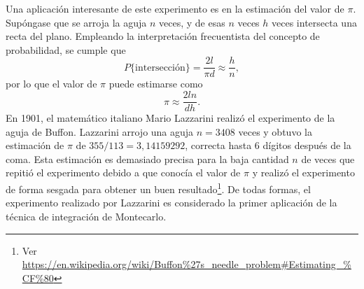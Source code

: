 \documentclass[a4paper]{report}
\begin{document}
Una aplicación interesante de este experimento es en la estimación del valor de \(\pi\). Supóngase que se arroja la aguja \(n\) veces, y de esas \(n\) veces \(h\) veces intersecta una recta del plano. Empleando la interpretación frecuentista del concepto de probabilidad, se cumple que
\[
 P\{\textrm{intersección}\}=\frac{2l}{\pi d}\approx\frac{h}{n},
\]
por lo que el valor de \(\pi\) puede estimarse como
\[
 \pi\approx\frac{2ln}{dh}.
\]
En 1901, el matemático italiano Mario Lazzarini realizó el experimento de la aguja de Buffon. Lazzarini arrojo una aguja \(n=3408\) veces y obtuvo la estimación de \(\pi\) de \(355/113=3,14159292\), correcta hasta 6 dígitos después de la coma. Esta estimación es demasiado precisa para la baja cantidad \(n\) de veces que repitió el experimento debido a que conocía el valor de \(\pi\) y realizó el experimento de forma sesgada para obtener un buen resultado\footnote{Ver \url{https://en.wikipedia.org/wiki/Buffon\%27s_needle_problem\#Estimating_\%CF\%80}}. De todas formas, el experimento realizado por Lazzarini es considerado la primer aplicación de la técnica de integración de Montecarlo.
\end{document}

